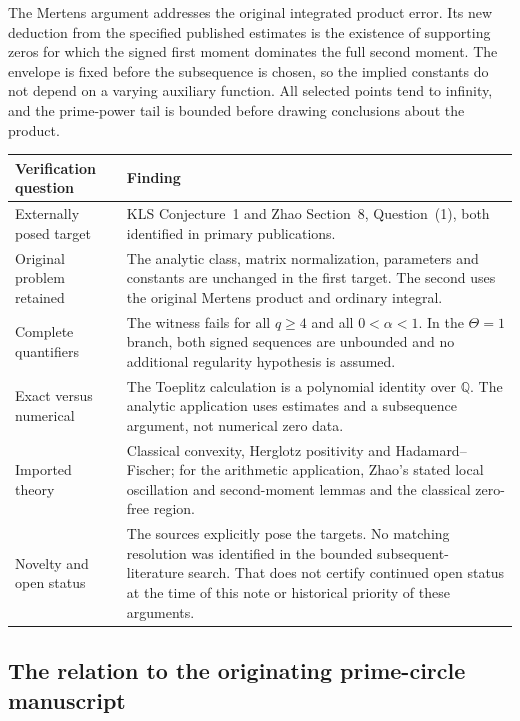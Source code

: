 \documentclass[11pt,a4paper]{article}
\numberwithin{equation}{section}
\theoremstyle{definition}\newtheorem{definition}[theorem]{Definition}
\theoremstyle{remark}\newtheorem{remark}[theorem]{Remark}
\begin{document}
The Mertens argument addresses the original integrated product error.
Its new deduction from the specified published estimates is the existence
of supporting zeros for which the signed first moment dominates the full
second moment. The envelope is fixed before the subsequence is chosen, so
the implied constants do not depend on a varying auxiliary function. All
selected points tend to infinity, and the prime-power tail is bounded
before drawing conclusions about the product.

\begin{center}\small
\begin{tabular}{@{}>{\raggedright\arraybackslash}p{}>{\raggedright\arraybackslash}p{}@{}}
\toprule
Verification question & Finding\\
\midrule
Externally posed target & KLS Conjecture~1 and Zhao Section~8,
Question~(1), both identified in primary publications.\\[4pt]
Original problem retained & The analytic class, matrix normalization,
parameters and constants are unchanged in the first target. The second
uses the original Mertens product and ordinary integral.\\[4pt]
Complete quantifiers & The witness fails for all $q\ge4$ and all
$0<\alpha<1$. In the $\Theta=1$ branch, both signed sequences are
unbounded and no additional regularity hypothesis is assumed.\\[4pt]
Exact versus numerical & The Toeplitz calculation is a polynomial identity
over $\mathbb Q$. The analytic application uses estimates and a subsequence
argument, not numerical zero data.\\[4pt]
Imported theory & Classical convexity, Herglotz positivity and
Hadamard--Fischer; for the arithmetic application, Zhao's stated local
oscillation and second-moment lemmas and the classical zero-free region.\\[4pt]
Novelty and open status & The sources explicitly pose the targets.
No matching resolution was identified in the bounded subsequent-literature
search. That does not certify continued open status at the time of this
note or historical priority of these arguments.\\
\bottomrule
\end{tabular}
\end{center}

\subsection{The relation to the originating prime-circle manuscript}
\end{document}
